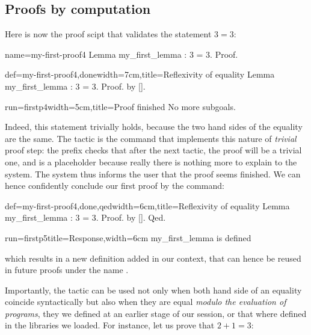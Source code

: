 \subsection{Proofs by computation}\label{ssec:proofcomp}

Here is now the proof scipt that validates the statement $3 = 3$:

\begin{coqdef}{name=my-first-proof4}
Lemma my_first_lemma : 3 = 3.
Proof.
\end{coqdef}
\begin{coq}{def=my-first-proof4,done}{width=7cm,title=Reflexivity of equality}
Lemma my_first_lemma : 3 = 3.
Proof. by [].
\end{coq}
\begin{coqout}{run=firstp4}{width=5cm,title=Proof finished}
No more subgoals.
$~$
\end{coqout}

Indeed, this statement trivially holds, because the two hand sides of
the equality are the same. The tactic  is the command that
implements this nature of \emph{trivial} proof step: the  prefix
checks that after the next tactic, the proof will be a trivial
one, and \C{[]} is a placeholder because really there is nothing more
to explain to the system. The system thus informs the user
that the proof seems finished. We can hence confidently conclude our
first proof by the  command:

\begin{coq}{def=my-first-proof4,done,qed}{width=6cm,title=Reflexivity of equality}
Lemma my_first_lemma : 3 = 3.
Proof. by []. Qed.
\end{coq}
\begin{coqout}{run=firstp5}{title=Response,width=6cm}
my_first_lemma is defined
\end{coqout}

which results in a new definition added in our context, that can hence
be reused in future proofs under the name .

Importantly, the  tactic can be used not only when both
hand side of an equality coincide syntactically but also when they are
equal \emph{modulo the evaluation of programs}, they we defined at an
earlier stage of our session, or that where defined in the libraries
we loaded. For instance, let us prove that $2 + 1 = 3$:

